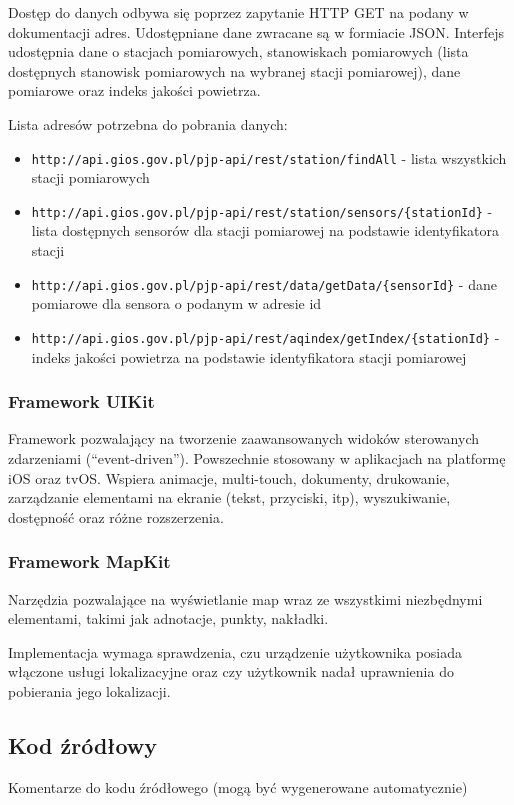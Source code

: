 \documentclass[a4paper,11pt,titlepage]{article}
\begin{document}
Dostęp do danych odbywa się poprzez zapytanie HTTP GET na podany w dokumentacji adres. Udostępniane dane zwracane są w formiacie JSON. Interfejs udostępnia dane o stacjach pomiarowych, stanowiskach pomiarowych (lista dostępnych stanowisk pomiarowych na wybranej stacji pomiarowej), dane pomiarowe oraz indeks jakości powietrza.

Lista adresów potrzebna do pobrania danych:
\begin{itemize}
 	\item \verb|http://api.gios.gov.pl/pjp-api/rest/station/findAll| - lista wszystkich stacji pomiarowych
	\item \verb|http://api.gios.gov.pl/pjp-api/rest/station/sensors/{stationId}| - lista dostępnych sensorów dla stacji pomiarowej na podstawie identyfikatora stacji
	\item \verb|http://api.gios.gov.pl/pjp-api/rest/data/getData/{sensorId}| - dane pomiarowe dla sensora o podanym w adresie id
	\item \verb|http://api.gios.gov.pl/pjp-api/rest/aqindex/getIndex/{stationId}| - indeks jakości powietrza na podstawie identyfikatora stacji pomiarowej
\end{itemize}
\subsubsection{Framework UIKit}
Framework pozwalający na tworzenie zaawansowanych widoków sterowanych zdarzeniami (``event-driven''). Powszechnie stosowany w aplikacjach na platformę iOS oraz tvOS. Wspiera animacje, multi-touch, dokumenty, drukowanie, zarządzanie elementami na ekranie (tekst, przyciski, itp), wyszukiwanie, dostępność oraz różne rozszerzenia.


\subsubsection{Framework MapKit}
Narzędzia pozwalające na wyświetlanie map wraz ze wszystkimi niezbędnymi elementami, takimi jak adnotacje, punkty, nakładki.

Implementacja wymaga sprawdzenia, czu urządzenie użytkownika posiada włączone usługi lokalizacyjne oraz czy użytkownik nadał uprawnienia do pobierania jego lokalizacji.

\subsection{Kod źródłowy}
Komentarze do kodu źródłowego (mogą być wygenerowane automatycznie)
\end{document}
